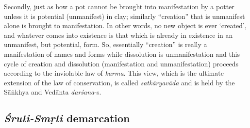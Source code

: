 Secondly, just as how a pot cannot be brought into manifestation by a potter unless it is potential (unmanifest) in clay; similarly ``creation'' that is unmanifest alone is brought to manifestation. In other words, no new object is ever `created', and whatever comes into existence is that which is already in existence in an unmanifest, but potential, form. So, essentially ``creation'' is really a manifestation of names and forms while dissolution is unmanifestation and this cycle of creation and dissolution (manifestation and unmanifestation) proceeds according to the inviolable law of {\sl karma}. This view, which is the ultimate extension of the law of conservation, is called {\sl satkāryavāda} and is held by the Sāṅkhya and Vedānta {\sl darśana}-s.

\subsection{{{\sl\bfseries Śruti-Smṛti}\relax} demarcation}\label{art12-sec2.4}

